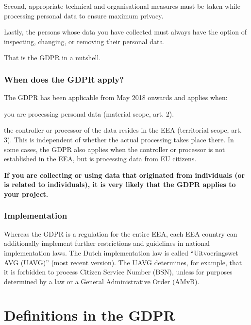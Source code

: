\documentclass[
]{book}
\begin{document}
Second, appropriate technical and organisational measures must be taken while processing
personal data to ensure maximum privacy.

Lastly, the persons whose data you have collected must always have the option of inspecting,
changing, or removing their personal data.

That is the GDPR in a nutshell.

\hypertarget{when-does-the-gdpr-apply}{%
\subsubsection{When does the GDPR apply?}\label{when-does-the-gdpr-apply}}

The GDPR has been applicable from May 2018 onwards and applies when:

you are processing personal data (material scope,
art. 2).

the controller or processor of the data resides in the EEA (territorial scope,
art. 3).
This is independent of whether the actual processing takes place there. In some cases, the GDPR
also applies when the controller or processor is not established in the EEA, but is
processing data from EU citizens.

\textbf{If you are collecting or using data that originated from individuals (or is related to individuals),
it is very likely that the GDPR applies to your project.}

\hypertarget{implementation}{%
\subsubsection{Implementation}\label{implementation}}

Whereas the GDPR is a regulation for the entire EEA, each EEA country can additionally
implement further restrictions and guidelines in national implementation laws. The Dutch
implementation law is called ``Uitvoeringswet AVG (UAVG)''
(most recent version).
The UAVG determines, for example, that it is forbidden to process Citizen Service Number (BSN),
unless for purposes determined by a law or a General Administrative Order (AMvB).

\hypertarget{definitions}{%
\section*{Definitions in the GDPR}\label{definitions}}
\end{document}
